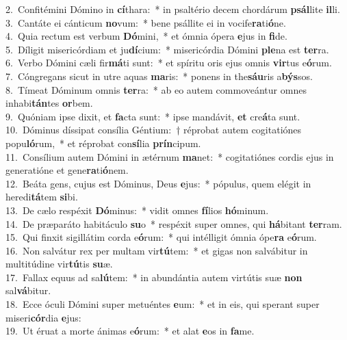 {2.~}Confitémini Dómino in \textbf{cí}thara:~* in psaltério decem chordárum \textbf{psál}lite \textbf{il}li.\\
{3.~}Cantáte ei cánticum \textbf{no}vum:~* bene psállite ei in vocife\textbf{ra}ti\textbf{ó}ne.\\
{4.~}Quia rectum est verbum \textbf{Dó}mini,~* et ómnia ópera \textbf{e}jus in \textbf{fi}de.\\
{5.~}Díligit misericórdiam et ju\textbf{dí}cium:~* misericórdia Dómini \textbf{ple}na est \textbf{ter}ra.\\
{6.~}Verbo Dómini cæli fir\textbf{má}ti sunt:~* et spíritu oris ejus omnis \textbf{vir}tus e\textbf{ó}rum.\\
{7.~}Cóngregans sicut in utre aquas \textbf{ma}ris:~* ponens in the\textbf{sáu}ris a\textbf{býs}sos.\\
{8.~}Tímeat Dóminum omnis \textbf{ter}ra:~* ab eo autem commoveántur omnes inhabi\textbf{tán}tes \textbf{or}bem.\\
{9.~}Quóniam ipse dixit, et \textbf{fa}cta sunt:~* ipse mandávit, \textbf{et} cre\textbf{á}ta sunt.\\
{10.~}Dóminus díssipat consília Géntium:~† réprobat autem cogitatiónes popu\textbf{ló}rum,~* et réprobat con\textbf{sí}lia \textbf{prín}cipum.\\
{11.~}Consílium autem Dómini in ætérnum \textbf{ma}net:~* cogitatiónes cordis ejus in generatióne et gene\textbf{ra}ti\textbf{ó}nem.\\
{12.~}Beáta gens, cujus est Dóminus, Deus \textbf{e}jus:~* pópulus, quem elégit in heredi\textbf{tá}tem \textbf{si}bi.\\
{13.~}De cælo respéxit \textbf{Dó}minus:~* vidit omnes \textbf{fí}lios \textbf{hó}minum.\\
{14.~}De præparáto habitáculo \textbf{su}o~* respéxit super omnes, qui \textbf{há}bitant \textbf{ter}ram.\\
{15.~}Qui finxit sigillátim corda e\textbf{ó}rum:~* qui intélligit ómnia ópe\textbf{ra} e\textbf{ó}rum.\\
{16.~}Non salvátur rex per multam vir\textbf{tú}tem:~* et gigas non salvábitur in multitúdine vir\textbf{tú}tis \textbf{su}æ.\\
{17.~}Fallax equus ad sa\textbf{lú}tem:~* in abundántia autem virtútis suæ \textbf{non} sal\textbf{vá}bitur.\\
{18.~}Ecce óculi Dómini super metuéntes \textbf{e}um:~* et in eis, qui sperant super miseri\textbf{cór}dia \textbf{e}jus:\\
{19.~}Ut éruat a morte ánimas e\textbf{ó}rum:~* et alat \textbf{e}os in \textbf{fa}me.\\

